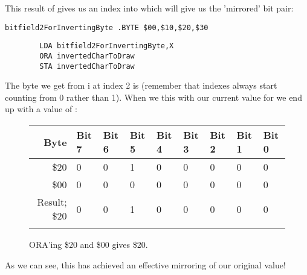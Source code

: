 This result of  gives us an index into  which will
give us the 'mirrored' bit pair:

\begin{lstlisting}
bitfield2ForInvertingByte .BYTE $00,$10,$20,$30
\end{lstlisting}
\begin{lstlisting}
        LDA bitfield2ForInvertingByte,X
        ORA invertedCharToDraw
        STA invertedCharToDraw
\end{lstlisting}

The byte we get from i at index 2 is  (remember that indexes
always start counting from 0 rather than 1). When we  this with our current value for
 we end up with a value of :


\begin{figure}[H]
  {
    \setlength{\tabcolsep}{3.0pt}
    \setlength\cmidrulewidth{\heavyrulewidth} %
    \begin{adjustbox}{width=10cm,center}

      \begin{tabular}{rllllllll}
        \toprule
        Byte & Bit 7 & Bit 6 & Bit 5 & Bit 4 & Bit 3 & Bit 2 & Bit 1 & Bit 0        \\
        \midrule
        \$20 & 0 & 0 & 1 & 0 & 0 & 0 & 0 & 0 \\
        \$00 & 0 & 0 & 0 & 0 & 0 & 0 & 0 & 0 \\
        \midrule
        Result; \$20 & 0 & 0 & 1 & 0 & 0 & 0 & 0 & 0 \\
        \addlinespace
        \bottomrule
      \end{tabular}

    \end{adjustbox}

  }\caption*{ORA'ing \$20 and \$00 gives \$20.}
\end{figure}

As we can see, this has achieved an effective mirroring of our original value!

